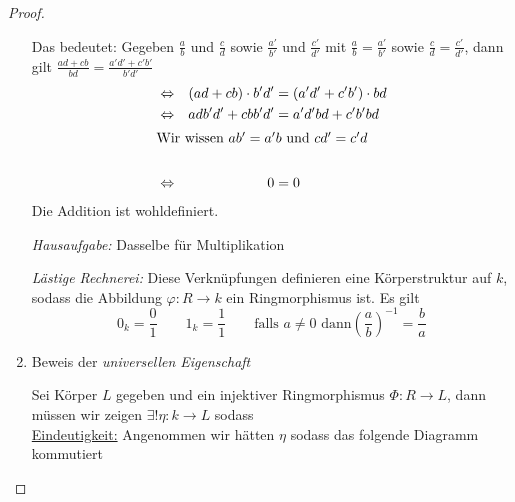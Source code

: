 \documentclass[a4paper,12pt,numbers=noenddot,parskip=full]{scrartcl}
\newcommand{\heading}{\underline}
\theoremstyle{dotless}
\theoremstyle{remark}
\begin{document}
\begin{proof}
\begin{enumerate}
			Das bedeutet: Gegeben $\frac{a}{b}$ und $\frac{c}{d}$ sowie $\frac{a'}{b'}$ und $\frac{c'}{d'}$ mit $\frac{a}{b} = \frac{a'}{b'}$ sowie $\frac{c}{d} = \frac{c'}{d'}$, dann gilt $\frac{ad + cb}{bd} = \frac{a'd' + c'b'}{b'd'}$
			\begin{align*}
				&\Leftrightarrow& (ad + cb) \cdot b'd' &= (a'd' + c'b') \cdot bd \\
				&\Leftrightarrow& adb'd' + cbb'd' &= a'd'bd + c'b'bd \\
				\intertext{Wir wissen $ab' = a'b$ und $cd' = c'd$} \\
				&\Leftrightarrow& 0 &= 0
			\end{align*}
			Die Addition ist wohldefiniert.
			
			\textit{Hausaufgabe:} Dasselbe für Multiplikation
			
			\textit{Lästige Rechnerei:} Diese Verknüpfungen definieren eine Körperstruktur auf $k$, sodass die Abbildung $\varphi: R \to k$ ein Ringmorphismus ist. Es gilt
			\begin{equation*}
				0_k = \frac01 \qquad 1_k = \frac11 \qquad \text{falls $a \neq 0$ dann} \left( \frac{a}{b} \right)^{-1} = \frac{b}{a}
			\end{equation*}
			
			\item Beweis der \emph{universellen Eigenschaft}
			
			Sei Körper $L$ gegeben und ein injektiver Ringmorphismus $\Phi: R \to L$, dann müssen wir zeigen $\exists! \eta: k \to L$ sodass \textellipsis \\
			\heading{Eindeutigkeit:} Angenommen wir hätten $\eta$ sodass das folgende Diagramm kommutiert
			\begin{center}
\end{center}
\end{enumerate}
\end{proof}
\end{document}
